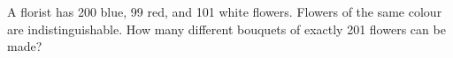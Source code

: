 A florist has 200 blue, 99 red, and 101 white flowers. Flowers of the same colour are indistinguishable. How many different bouquets of exactly 201 flowers can be made?
